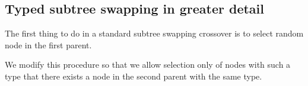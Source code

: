 \documentclass{sig-alternate}
\begin{document}






\subsection{Typed subtree swapping in greater detail}
\label{typed-swapping}



The first thing to do in a standard subtree swapping cross\-over is to select random node in the first parent. 

We modify this procedure so that we allow selection only of nodes with such a type that there exists a node in the second parent with the same type.
\end{document}
